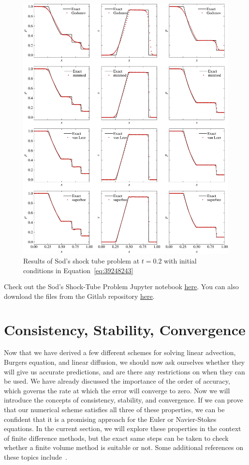 \begin{figure}[htb]
	\centering
	\includegraphics[width=\linewidth]{Pictures/euler_muscl}
	\caption{Results of Sod's shock tube problem at $t=0.2$ with initial conditions in Equation~\ref{eq:39248243}}
	\label{fig:euler_muscl}
\end{figure}
\begin{jupyternote}
	Check out the Sod's Shock-Tube Problem Jupyter notebook \href{\binderurl}{\underline{here}}. You can also download the files from the Gitlab repository \href{\repourl}{\underline{here}}.
\end{jupyternote}

\chapter{Consistency, Stability, Convergence}
Now that we have derived a few different schemes for solving linear advection, Burgers equation, and linear diffusion, we should now ask ourselves whether they will give us accurate predictions, and are there any restrictions on when they can be used. We have already discussed the importance of the order of accuracy, which governs the rate at which the error will converge to zero. Now we will introduce the concepts of consistency, stability, and convergence. If we can prove that our numerical scheme satisfies all three of these properties, we can be confident that it is a promising approach for the Euler or Navier-Stokes equations. In the current section, we will explore these properties in the context of finite difference methods, but the exact same steps can be taken to check whether a finite volume method is suitable or not. Some additional references on these topics include~\cite{hirschNumericalComputationInternal2007a,andersonComputationalFluidMechanics2016}.

